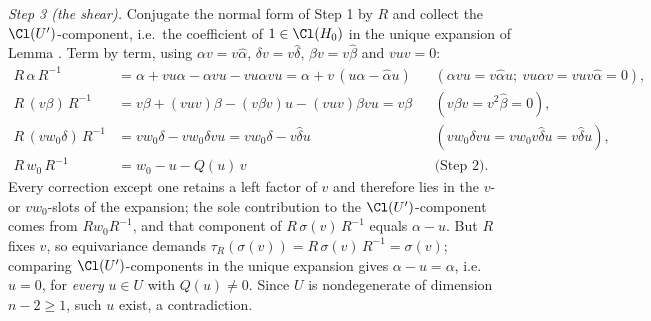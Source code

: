 \emph{Step 3 (the shear).} Conjugate the normal form of Step 1 by $R$ and collect the $\Cl(U')$-component, i.e.\ the coefficient of $1 \in \Cl(H_0)$ in the unique expansion of Lemma . Term by term, using $\alpha v = v\hat\alpha$, $\delta v = v \hat\delta$, $\beta v = v\hat\beta$ and $vuv = 0$:
\begin{align*}
R\,\alpha\,R^{-1} &= \alpha + vu\alpha - \alpha vu - vu\alpha vu
= \alpha + v\,(u\alpha - \hat{\alpha}u) && (\alpha vu = v\hat\alpha u;\ vu\alpha v = vuv\hat\alpha = 0),\\
R\,(v\beta)\,R^{-1} &= v\beta + (vuv)\beta - (v\beta v)u - (vuv)\beta vu = v\beta && (v\beta v = v^2\hat\beta = 0),\\
R\,(v w_0 \delta)\,R^{-1} &= v w_0 \delta - v w_0 \delta v u = v w_0 \delta - v\hat{\delta}u && (v w_0 \delta v u = v w_0 v \hat{\delta} u = v \hat\delta u),\\
R\,w_0\,R^{-1} &= w_0 - u - Q(u)\,v && \text{(Step 2)}.
\end{align*}
Every correction except one retains a left factor of $v$ and therefore lies in the $v$- or $vw_0$-slots of the expansion; the sole contribution to the $\Cl(U')$-component comes from $R w_0 R^{-1}$, and that component of $R\,\sigma(v)\,R^{-1}$ equals $\alpha - u$. But $R$ fixes $v$, so equivariance demands $\tau_R(\sigma(v)) = R\,\sigma(v)\,R^{-1} = \sigma(v)$; comparing $\Cl(U')$-components in the unique expansion gives $\alpha - u = \alpha$, i.e.\ $u = 0$, for \emph{every} $u \in U$ with $Q(u) \neq 0$. Since $U$ is nondegenerate of dimension $n - 2 \geq 1$, such $u$ exist, a contradiction.
